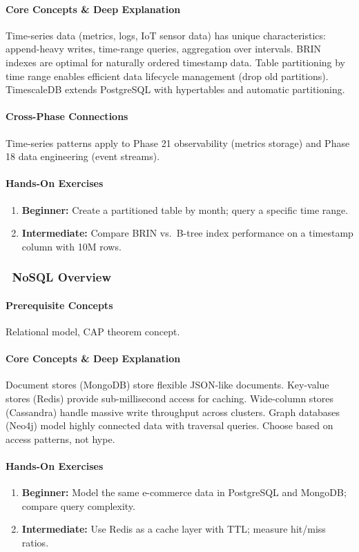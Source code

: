 \documentclass[11pt, a4paper, oneside]{report}
\newcommand{\awareness}[1]{\subsubsection{\texorpdfstring{\fcolorbox{gray!50}{gray!10}{\footnotesize\bfseries\color{gray!50!black} AWARENESS}~#1}{#1}}}
\begin{document}
\paragraph{Core Concepts \& Deep Explanation} Time-series data (metrics, logs, IoT sensor data) has unique characteristics: append-heavy writes, time-range queries, aggregation over intervals. BRIN indexes are optimal for naturally ordered timestamp data. Table partitioning by time range enables efficient data lifecycle management (drop old partitions). TimescaleDB extends PostgreSQL with hypertables and automatic partitioning.

\paragraph{Cross-Phase Connections} Time-series patterns apply to Phase 21 observability (metrics storage) and Phase 18 data engineering (event streams).

\paragraph{Hands-On Exercises}
\begin{enumerate}[leftmargin=*]
\item \textbf{Beginner:} Create a partitioned table by month; query a specific time range.
\item \textbf{Intermediate:} Compare BRIN vs.\ B-tree index performance on a timestamp column with 10M rows.
\end{enumerate}

\awareness{NoSQL Overview}

\paragraph{Prerequisite Concepts} Relational model, CAP theorem concept.

\paragraph{Core Concepts \& Deep Explanation} Document stores (MongoDB) store flexible JSON-like documents. Key-value stores (Redis) provide sub-millisecond access for caching. Wide-column stores (Cassandra) handle massive write throughput across clusters. Graph databases (Neo4j) model highly connected data with traversal queries. Choose based on access patterns, not hype.

\paragraph{Hands-On Exercises}
\begin{enumerate}[leftmargin=*]
\item \textbf{Beginner:} Model the same e-commerce data in PostgreSQL and MongoDB; compare query complexity.
\item \textbf{Intermediate:} Use Redis as a cache layer with TTL; measure hit/miss ratios.
\end{enumerate}
\end{document}
